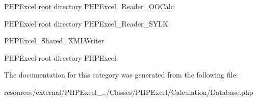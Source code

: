 P\+H\+P\+Excel root directory P\+H\+P\+Excel\+\_\+\+Reader\+\_\+\+O\+O\+Calc

P\+H\+P\+Excel root directory P\+H\+P\+Excel\+\_\+\+Reader\+\_\+\+S\+Y\+LK

P\+H\+P\+Excel\+\_\+\+Shared\+\_\+\+X\+M\+L\+Writer

P\+H\+P\+Excel root directory P\+H\+P\+Excel 

The documentation for this category was generated from the following file\+:\begin{DoxyCompactItemize}
\item 
resources/external/\+P\+H\+P\+Excel\+\_../\+Classes/\+P\+H\+P\+Excel/\+Calculation/Database.\+php\end{DoxyCompactItemize}
